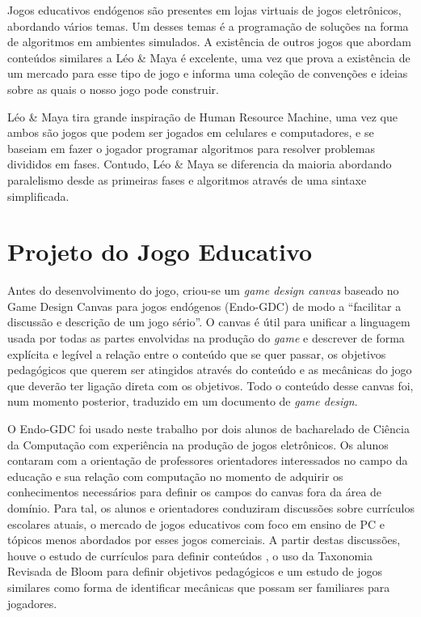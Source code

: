 \documentclass[conference]{IEEEtran}
\begin{document}
Jogos educativos endógenos são presentes em lojas virtuais de jogos eletrônicos, abordando vários temas. Um desses temas é a programação de soluções na forma de algoritmos em ambientes simulados\cite{googleplay}\cite{gogcom}\cite{steam_tag_programming}. A existência de outros jogos que abordam conteúdos similares a Léo \& Maya é excelente, uma vez que prova a existência de um mercado para esse tipo de jogo e informa uma coleção de convenções e ideias sobre as quais o nosso jogo pode construir.

Léo \& Maya tira grande inspiração de Human Resource Machine\cite{humanresourcemachine}, uma vez que ambos são jogos que podem ser jogados em celulares e computadores, e se baseiam em fazer o jogador programar algoritmos para resolver problemas  divididos em fases. Contudo, Léo \& Maya se diferencia da maioria abordando paralelismo desde as primeiras fases e algoritmos através de uma sintaxe simplificada.

\section{Projeto do Jogo Educativo}

Antes do desenvolvimento do jogo, criou-se um \textit{game design canvas} baseado no Game Design Canvas para jogos endógenos (Endo-GDC) de modo a ``facilitar a discussão e descrição de um jogo sério''\cite{taucei_endo-gdc_nodate}. O canvas é útil para unificar a linguagem usada por todas as partes envolvidas na produção do \textit{game} e descrever de forma explícita e legível a relação entre o conteúdo que se quer passar, os objetivos pedagógicos que querem ser atingidos através do conteúdo e as mecânicas do jogo que deverão ter ligação direta com os objetivos. Todo o conteúdo desse canvas foi, num momento posterior, traduzido em um documento de \textit{game design}. 

O Endo-GDC foi usado neste trabalho por dois alunos de bacharelado de Ciência da Computação com experiência na produção de jogos eletrônicos. Os alunos contaram com a orientação de professores orientadores interessados no campo da educação e sua relação com computação no momento de adquirir os conhecimentos necessários para definir os campos do canvas fora da área de domínio. Para tal, os alunos e orientadores conduziram discussões sobre currículos escolares atuais, o mercado de jogos educativos com foco em ensino de PC e tópicos menos abordados por esses jogos comerciais. A partir destas discussões, houve o estudo de currículos para definir conteúdos \cite{govuk} \cite{tch060}, o uso da Taxonomia Revisada de Bloom para definir objetivos pedagógicos \cite{krathwohl} e um estudo de jogos similares como forma de identificar mecânicas que possam ser familiares para jogadores.
\end{document}
